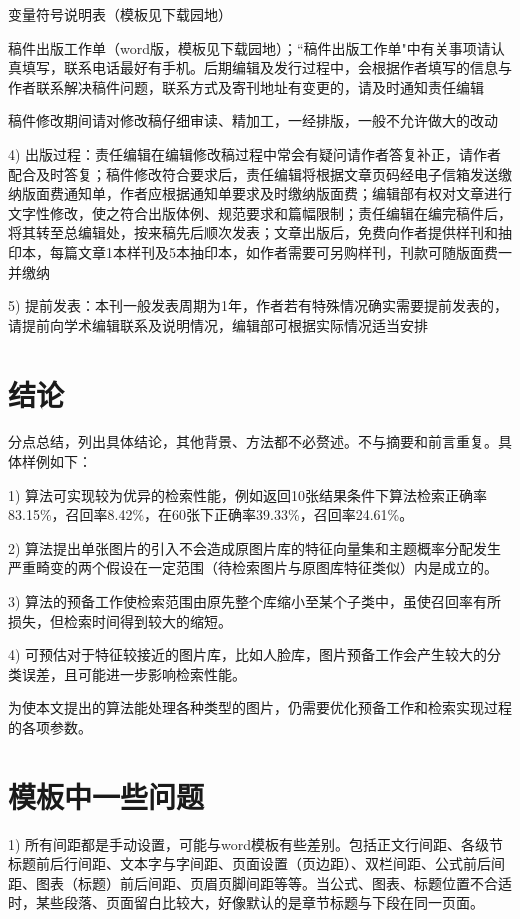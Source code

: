 \documentclass[10.5pt,twocolumn]{aaas}
\newcommand*\circled[1]{\tikz[baseline=(char.base)]{
            \node[shape=circle,draw,inner sep=1pt] (char) {#1};}}
\newcommand\mycolorRed[1]{{\color{red}#1}}
\begin{document}
\circled{\xiaowuhao 3} 变量符号说明表（模板见下载园地）

\circled{\xiaowuhao 4} 稿件出版工作单（word版，模板见下载园地）；``稿件出版工作单"中有关事项请认真填写，联系电话最好有手机。后期编辑及发行过程中，会根据作者填写的信息与作者联系解决稿件问题，联系方式及寄刊地址有变更的，请及时通知责任编辑

稿件修改期间请对修改稿仔细审读、精加工，一经排版，一般不允许做大的改动

4) 出版过程：责任编辑在编辑修改稿过程中常会有疑问请作者答复补正，请作者配合及时答复；稿件修改符合要求后，责任编辑将根据文章页码经电子信箱发送缴纳版面费通知单，作者应根据通知单要求及时缴纳版面费；编辑部有权对文章进行文字性修改，使之符合出版体例、规范要求和篇幅限制；责任编辑在编完稿件后，将其转至总编辑处，按来稿先后顺次发表；文章出版后，免费向作者提供样刊和抽印本，每篇文章1本样刊及5本抽印本，如作者需要可另购样刊，刊款可随版面费一并缴纳

5) 提前发表：本刊一般发表周期为1年，作者若有特殊情况确实需要提前发表的，请提前向学术编辑联系及说明情况，编辑部可根据实际情况适当安排

\section{结\quad 论}
分点总结，列出具体结论，其他背景、方法都不必赘述。不与摘要和前言重复。具体样例如下：

1) 算法可实现较为优异的检索性能，例如返回10张结果条件下算法检索正确率83.15\%，召回率8.42\%，在60张下正确率39.33\%，召回率24.61\%。

2) 算法提出单张图片的引入不会造成原图片库的特征向量集和主题概率分配发生严重畸变的两个假设在一定范围（待检索图片与原图库特征类似）内是成立的。

3) 算法的预备工作使检索范围由原先整个库缩小至某个子类中，虽使召回率有所损失，但检索时间得到较大的缩短。

4) 可预估对于特征较接近的图片库，比如人脸库，图片预备工作会产生较大的分类误差，且可能进一步影响检索性能。

为使本文提出的算法能处理各种类型的图片，仍需要优化预备工作和检索实现过程的各项参数。


\section{\mycolorRed{模板中一些问题}}

1) 所有\mycolorRed{间距}都是手动设置，可能与word模板有些差别。包括正文行间距、各级节标题前后行间距、文本字与字间距、页面设置（页边距）、双栏间距、公式前后间距、图表（标题）前后间距、页眉页脚间距等等。当公式、图表、标题位置不合适时，某些段落、页面留白比较大，好像默认的是章节标题与下段在同一页面。
\end{document}
